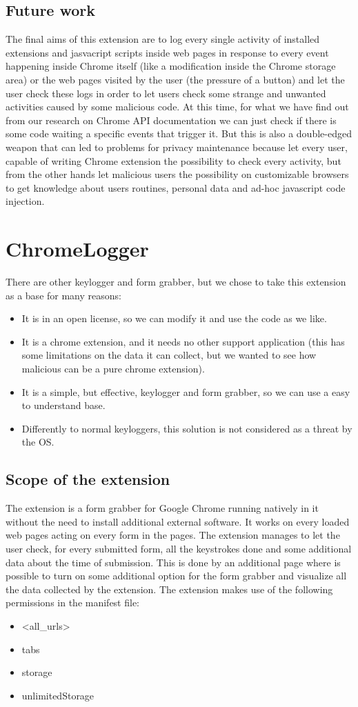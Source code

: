\documentclass[12pt]{article}
\begin{document}
\begin{multicols}{2}
\subsection*{Future work}
The final aims of this extension are to log every single activity of installed extensions and jasvacript scripts inside web pages in response to every event happening inside Chrome itself (like a modification inside the Chrome storage area) or the web pages visited by the user (the pressure of a button) and let the user check these logs	in order to let users check some strange and unwanted activities caused by some malicious code. At this time, for what we have find out from our research on Chrome API documentation we can just check if there is some code waiting a specific events that trigger it.
But this is also a double-edged weapon that can led to problems for privacy maintenance because let every user, capable of writing Chrome extension the possibility to check every activity, but from the other hands let malicious users the possibility  on customizable browsers to get knowledge about users routines, personal data and ad-hoc javascript code injection.
\section*{ChromeLogger}
There are other keylogger and form grabber, but we chose to take this extension as a base for many reasons:
\begin{itemize}
	\item It is in an open license, so we can modify it and use the code as we like.
	\item It is a chrome extension, and it needs no other support application (this has some limitations on the data it can collect, but we wanted to see how malicious can be a pure chrome extension).
	\item It is a simple, but effective, keylogger and form grabber, so we can use a easy to understand base.
	\item Differently to normal keyloggers, this solution is not considered as a threat by the OS.
\end{itemize} 
\subsection*{Scope of the extension}
The extension is a form grabber for Google Chrome running natively in it without the need to install additional external software. It works on every loaded web pages acting on every form in the pages.
The extension manages to let the user check, for every submitted form, all the keystrokes done and some additional data about the time of submission. This is done by an additional page where is possible to turn on some additional option for the form grabber and visualize all the data collected by the extension.
The extension makes use of the following permissions in the manifest file:
\begin{itemize}
	\item  <all\_urls>
	\item  tabs
	\item  storage
	\item  unlimitedStorage
\end{itemize}

\end{multicols}
\end{document}
